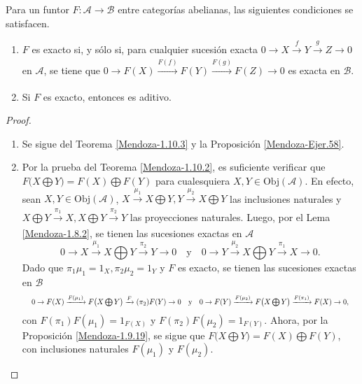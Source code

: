 \documentclass[tesis]{subfiles}
\begin{document}
\begin{Coro}\label{Mendoza-1.10.4}
    Para un funtor $F:\mathscr{A}\to \mathscr{B}$ entre categorías abelianas, las siguientes condiciones se satisfacen.

    \begin{enumerate}[label=(\alph*)]
    
        \item $F$ es exacto si, y sólo si, para cualquier sucesión exacta $0\to X\xrightarrow[]{f} Y\xrightarrow[]{g} Z\to 0$ en $\mathscr{A}$, se tiene que $0\to F(X)\xrightarrow[]{F(f)} F(Y)\xrightarrow[]{F(g)} F(Z)\to 0$ es exacta en $\mathscr{B}$.
            
        \item Si $F$ es exacto, entonces es aditivo.
    \end{enumerate}
\end{Coro}

\begin{proof}\leavevmode

    \begin{enumerate}[label=(\alph*)]
    
        \item Se sigue del Teorema \ref{Mendoza-1.10.3} y la Proposición \ref{Mendoza-Ejer.58}.

        \item Por la prueba del Teorema \ref{Mendoza-1.10.2}, es suficiente verificar que $F\big(X\bigoplus Y\big)= F(X)\bigoplus F(Y)$ para cualesquiera $X,Y\in\text{Obj}(\mathscr{A})$. En efecto, sean $X,Y\in\text{Obj}(\mathscr{A})$, $X\xrightarrow[]{\mu_1} X\bigoplus Y, Y\xrightarrow[]{\mu_2}X\bigoplus Y$ las inclusiones naturales y $X\bigoplus Y\xrightarrow[]{\pi_1} X, X\bigoplus Y\xrightarrow[]{\pi_2}Y$ las proyecciones naturales. Luego, por el Lema \ref{Mendoza-1.8.2}, se tienen las sucesiones exactas en $\mathscr{A}$
            \[
                0\to X\xrightarrow[]{\mu_1} X\bigoplus Y\xrightarrow[]{\pi_2} Y\to 0 \quad \text{y} \quad 0\to Y\xrightarrow[]{\mu_2} X\bigoplus Y\xrightarrow[]{\pi_1} X\to 0.
            \] 
            Dado que $\pi_1\mu_1=1_X, \pi_2\mu_2=1_Y$ y $F$ es exacto, se tienen las sucesiones exactas en $\mathscr{B}$
            \[
                \resizebox{0.94\hsize}{!}{$0\to F(X)\xrightarrow[]{F(\mu_1)} F\big(X\bigoplus Y\big)\xrightarrow[]F({\pi_2)} F(Y)\to 0 \quad \text{y} \quad 0\to F(Y)\xrightarrow[]{F(\mu_2)} F\big(X\bigoplus Y\big)\xrightarrow[]{F(\pi_1)} F(X)\to 0,$}
            \] 
            con $F(\pi_1)F(\mu_1)=1_{F(X)}$ y $F(\pi_2)F(\mu_2)=1_{F(Y)}$. Ahora, por la Proposición \ref{Mendoza-1.9.19}, se sigue que $F\big(X\bigoplus Y\big) = F(X)\bigoplus F(Y)$, con inclusiones naturales $F(\mu_1)$ y $F(\mu_2)$.
            
    \end{enumerate}
\end{proof}
\end{document}
